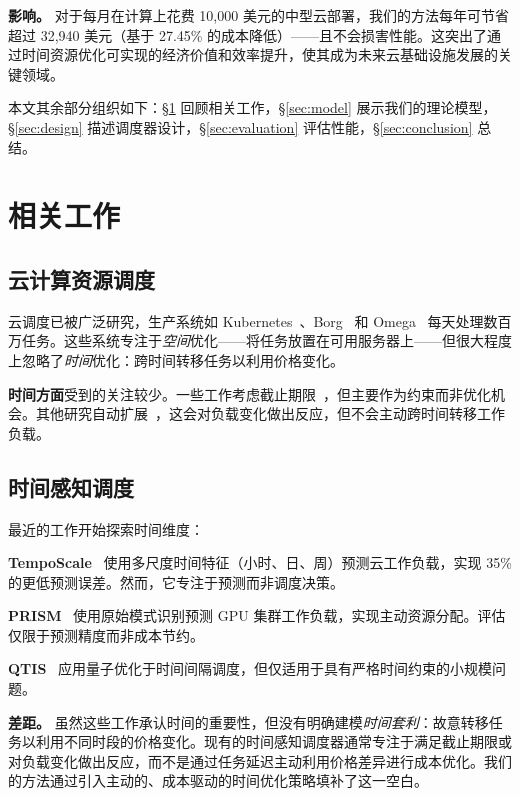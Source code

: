 \documentclass[10pt,a4paper]{article}
\begin{document}
\textbf{影响。} 对于每月在计算上花费 10,000 美元的中型云部署，我们的方法每年可节省超过 32,940 美元（基于 27.45\% 的成本降低）——且不会损害性能。这突出了通过时间资源优化可实现的经济价值和效率提升，使其成为未来云基础设施发展的关键领域。

本文其余部分组织如下：\S\ref{sec:related} 回顾相关工作，\S\ref{sec:model} 展示我们的理论模型，\S\ref{sec:design} 描述调度器设计，\S\ref{sec:evaluation} 评估性能，\S\ref{sec:conclusion} 总结。

\section{相关工作}
\label{sec:related}

\subsection{云计算资源调度}

云调度已被广泛研究，生产系统如 Kubernetes~\cite{kubernetes2025}、Borg~\cite{verma2015large} 和 Omega~\cite{tumanov2016omega} 每天处理数百万任务。这些系统专注于\textit{空间}优化——将任务放置在可用服务器上——但很大程度上忽略了\textit{时间}优化：跨时间转移任务以利用价格变化。

\textbf{时间方面}受到的关注较少。一些工作考虑截止期限~\cite{chaudhry2019deadline}，但主要作为约束而非优化机会。其他研究自动扩展~\cite{lorido2014review}，这会对负载变化做出反应，但不会主动跨时间转移工作负载。

\subsection{时间感知调度}

最近的工作开始探索时间维度：

\textbf{TempoScale}~\cite{wen2024temposcale} 使用多尺度时间特征（小时、日、周）预测云工作负载，实现 35\% 的更低预测误差。然而，它专注于预测而非调度决策。

\textbf{PRISM}~\cite{wu2026prism} 使用原始模式识别预测 GPU 集群工作负载，实现主动资源分配。评估仅限于预测精度而非成本节约。

\textbf{QTIS}~\cite{tirado2025qtis} 应用量子优化于时间间隔调度，但仅适用于具有严格时间约束的小规模问题。

\textbf{差距。} 虽然这些工作承认时间的重要性，但没有明确建模\textit{时间套利}：故意转移任务以利用不同时段的价格变化。现有的时间感知调度器通常专注于满足截止期限或对负载变化做出反应，而不是通过任务延迟主动利用价格差异进行成本优化。我们的方法通过引入主动的、成本驱动的时间优化策略填补了这一空白。
\end{document}
